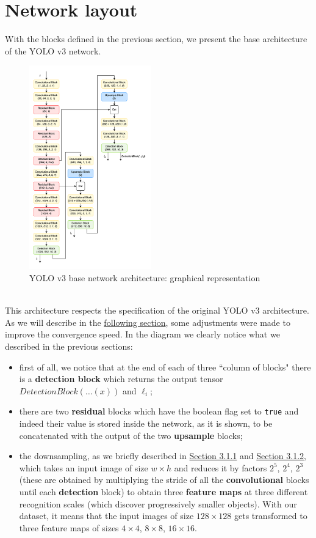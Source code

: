 \documentclass[../report.tex]{subfiles}
\begin{document}
\newpage
\section{Network layout}\label{s:network-layout}
With the blocks defined in the previous section, we present the base architecture of the YOLO v3 network.
\begin{figure}[!h]
    \centering
    \includegraphics[width=0.47\textwidth]{assets/images/network_base}
    \caption{YOLO v3 base network architecture: graphical representation}\label{img:yolo_v3_base_network_architecture}
\end{figure}\\
This architecture respects the specification of the original YOLO v3 architecture.
As we will describe in the \hyperref[c:tests-and-results]{following section}, some adjustments were made to improve the convergence speed.
In the diagram we clearly notice what we described in the previous sections:
\begin{itemize}
    \item first of all, we notice that at the end of each of three ``column of blocks" there is a \textbf{detection block} which returns the output tensor $DetectionBlock(\dots(x))$ and $\ell_i$;
    \item there are two \textbf{residual} blocks which have the boolean flag set to \texttt{true} and indeed their value is stored inside the network, as it is shown, to be concatenated with the output of the two \textbf{upsample} blocks;
    \item the downsampling, as we briefly described in \hyperref[ss:yolo-history]{Section 3.1.1} and \hyperref[ss:arch-glance]{Section 3.1.2}, which takes an input image of size $w \times{} h$ and reduces it by factors $2^5$, $2^4$, $2^3$ (these are obtained by multiplying the stride of all the \textbf{convolutional} blocks until each \textbf{detection} block) to obtain three \textbf{feature maps} at three different recognition scales (which discover progressively smaller objects).
    With our dataset, it means that the input images of size $128\times{}128$ gets transformed to three feature maps of sizes $4\times{}4$, $8\times{}8$, $16\times{}16$.
\end{itemize}
\end{document}
